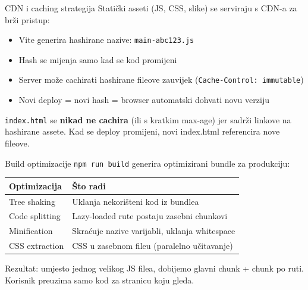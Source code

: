 \begin{frame}{CDN i caching strategija}
Statički asseti (JS, CSS, slike) se serviraju s CDN-a za brži pristup:

\vspace{0.4em}
\begin{itemize}
  \item Vite generira hashirane nazive: \texttt{main-abc123.js}
  \item Hash se mijenja samo kad se kod promijeni
  \item Server može cachirati hashirane fileove zauvijek (\texttt{Cache-Control: immutable})
  \item Novi deploy = novi hash = browser automatski dohvati novu verziju
\end{itemize}

\vspace{0.6em}
\texttt{index.html} se \textbf{nikad ne cachira} (ili s kratkim max-age) jer sadrži linkove na hashirane assete. Kad se deploy promijeni, novi index.html referencira nove fileove.
\end{frame}

\begin{frame}{Build optimizacije}
\texttt{npm run build} generira optimizirani bundle za produkciju:

\vspace{0.4em}
\begin{tabular}{@{}lp{8cm}@{}}
  \toprule
  \textbf{Optimizacija} & \textbf{Što radi} \\
  \midrule
  Tree shaking & Uklanja nekorišteni kod iz bundlea \\
  Code splitting & Lazy-loaded rute postaju zasebni chunkovi \\
  Minification & Skraćuje nazive varijabli, uklanja whitespace \\
  CSS extraction & CSS u zasebnom fileu (paralelno učitavanje) \\
  \bottomrule
\end{tabular}

\vspace{0.6em}
Rezultat: umjesto jednog velikog JS filea, dobijemo glavni chunk + chunk po ruti. Korisnik preuzima samo kod za stranicu koju gleda.
\end{frame}

